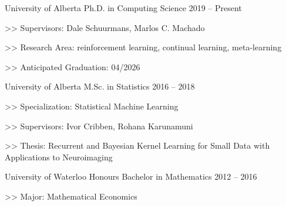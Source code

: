 
\begin{cventries}
  \cventry
    {University of Alberta}
    {Ph.D. in Computing Science}
    {2019 -- Present}
    {
      \begin{cvitems}
        \item[>>] {Supervisors: Dale Schuurmans, Marlos C. Machado}
        \item[>>] {Research Area: reinforcement learning, continual learning, meta-learning}
        \item[>>] {Anticipated Graduation: 04/2026}
      \end{cvitems}
    }

  \cventry
    {University of Alberta}
    {M.Sc. in Statistics}
    {2016 -- 2018}
    {
      \begin{cvitems}
        \item[>>] {Specialization: Statistical Machine Learning}
        \item[>>] {Supervisors: Ivor Cribben, Rohana Karunamuni}
        \item[>>] {Thesis: Recurrent and Bayesian Kernel Learning for Small Data with Applications to Neuroimaging}
      \end{cvitems}
    }
  \cventry
    {University of Waterloo}
    {Honours Bachelor in Mathematics}
    {2012 -- 2016}
    {
      \begin{cvitems}
        \item[>>] Major: Mathematical Economics
      \end{cvitems}
    }
\end{cventries}

